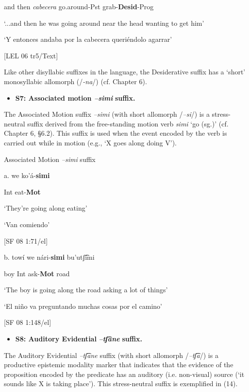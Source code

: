     and   then   \textit{cabecera}  go.around-Pst  grab-\textbf{Desid}{}-Prog

    ‘...and then he was going around near the head wanting to get him’

‘Y entonces andaba por la cabecera queriéndolo agarrar’ 

[LEL 06 tr5/Text]

  Like other disyllabic suffixes in the language, the Desiderative suffix has a ‘short’ monosyllabic allomorph (/\textit{{}-na}/) (cf. Chapter 6). 

\begin{itemize}
\item \textbf{S7: Associated motion \textit{–simi} }\textbf{suffix.}
\end{itemize}

The Associated Motion suffix \textit{–simi} (with short allomorph /\textit{–si}/) is a stress-neutral suffix derived from the free-standing motion verb \textit{simi} ‘go (sg.)’ (cf. Chapter 6, §6.2). This suffix is used when the event encoded by the verb is carried out while in motion (e.g., ‘X goes along doing V’). 

   Associated Motion \textit{–simi} suffix

  a.   we   ko’á-\textbf{simi}

    Int  eat-\textbf{Mot}

    ‘They’re going along eating’

    ‘Van comiendo’          

    [SF 08 1:71/el]

b.   towí  we   nári-\textbf{simi}  bu’utʃ͡ími

    boy  Int  ask-\textbf{Mot}  road

    ‘The boy is going along the road asking a lot of things’

    ‘El niño va preguntando muchas cosas por el camino’ 

    [SF 08 1:148/el]

\begin{itemize}
\item \textbf{S8: Auditory Evidential} \textbf{\textit{–tʃ͡ane}} \textbf{suffix.}
\end{itemize}

The Auditory Evidential \textit{–tʃ͡ane} suffix (with short allomorph /\textit{–tʃ͡a}/) is a productive epistemic modality marker that indicates that the evidence of  the proposition encoded by the predicate has an auditory (i.e. non-visual) source (‘it sounds like X is taking place’). This stress-neutral suffix is exemplified in (14).

